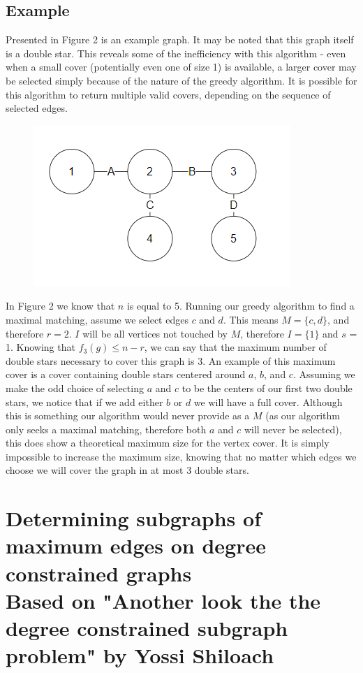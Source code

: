 \documentclass{article}
\begin{document}
		\subsection{Example}
		Presented in Figure 2 is an example graph. It may be noted that this graph itself is a double star. This reveals some of the inefficiency with this algorithm - even when a small cover (potentially even one of size 1) is available, a larger cover may be selected simply because of the nature of the greedy algorithm. It is possible for this algorithm to return multiple valid covers, depending on the sequence of selected edges.
		 \\
				\begin{figure}[H]
				\caption{}
				\includegraphics{Figure2}
			\end{figure}
			In Figure 2 we know that $n$ is equal to 5. Running our greedy algorithm to find a maximal matching, assume we select edges $c$ and $d$. This means $M = \{c,d\}$, and therefore $r = 2$. $I$ will be all vertices not touched by $M$, therefore $I = \{1\}$ and $s$ = 1. Knowing that $f_{3}(g) \leq n-r$, we can say that the maximum number of double stars necessary to cover this graph is 3. An example of this maximum cover is a cover containing double stars centered around $a$, $b$, and $c$. Assuming we make the odd choice of selecting $a$ and $c$ to be the centers of our first two double stars, we notice that if we add either $b$ or $d$ we will have a full cover. Although this is something our algorithm would never provide as a $M$ (as our algorithm only seeks a maximal matching, therefore both $a$ and $c$ will never be selected), this does show a theoretical maximum size for the vertex cover. It is simply impossible to increase the maximum size, knowing that no matter which edges we choose we will cover the graph in at most 3 double stars.
			
	\section{Determining subgraphs of maximum edges on degree constrained graphs \\ {\small Based on "Another look the the degree constrained subgraph problem" by Yossi Shiloach \cite{2}}  }
\end{document}
